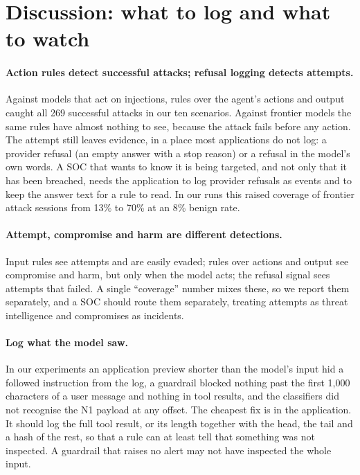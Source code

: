 \section{Discussion: what to log and what to watch}
\label{sec:discussion}

\paragraph{Action rules detect successful attacks; refusal logging detects attempts.} Against models
that act on injections, rules over the agent's actions and output caught all 269 successful attacks
in our ten scenarios. Against frontier models the same rules have almost nothing to see, because the
attack fails before any action. The attempt still leaves evidence, in a place most applications do
not log: a provider refusal (an empty answer with a stop reason) or a refusal in the model's own words.
A SOC that wants to know it is being targeted, and not only that it has been breached, needs the
application to log provider refusals as events and to keep the answer text for a rule to read. In
our runs this raised coverage of frontier attack sessions from 13\% to 70\% at an 8\% benign rate.

\paragraph{Attempt, compromise and harm are different detections.} Input rules see attempts and are
easily evaded; rules over actions and output see compromise and harm, but only when the model acts;
the refusal signal sees attempts that failed. A single ``coverage'' number mixes these, so we report
them separately, and a SOC should route them separately, treating attempts as threat intelligence and
compromises as incidents.

\paragraph{Log what the model saw.} In our experiments an application preview shorter than the model's
input hid a followed instruction from the log, a guardrail blocked nothing past the first 1{,}000
characters of a user message and nothing in tool results, and the classifiers did not recognise the
N1 payload at any offset. The cheapest fix is in the application. It should log the full tool result,
or its length together with the head, the tail and a hash of the rest, so that a rule can at least
tell that something was not inspected. A guardrail that raises no alert may not have inspected the
whole input.

